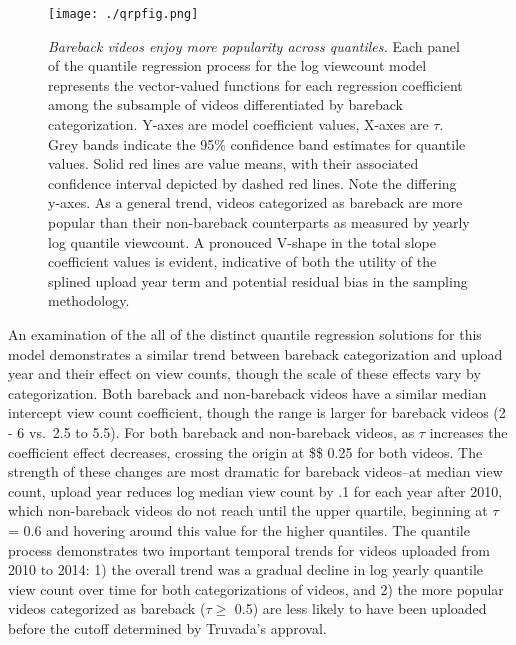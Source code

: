 \documentclass[]{article}
\begin{document}
\begin{figure}
\centering
\texttt{[image: ./qrpfig.png]}
\caption{\emph{Bareback videos enjoy more popularity across quantiles.}
Each panel of the quantile regression process for the log viewcount
model represents the vector-valued functions for each regression
coefficient among the subsample of videos differentiated by bareback
categorization. Y-axes are model coefficient values, X-axes are
\(\tau\). Grey bands indicate the 95\% confidence band estimates for
quantile values. Solid red lines are value means, with their associated
confidence interval depicted by dashed red lines. Note the differing
y-axes. As a general trend, videos categorized as bareback are more
popular than their non-bareback counterparts as measured by yearly log
quantile viewcount. A pronouced V-shape in the total slope coefficient
values is evident, indicative of both the utility of the splined upload
year term and potential residual bias in the sampling methodology.}
\end{figure}

An examination of the all of the distinct quantile regression solutions
for this model demonstrates a similar trend between bareback
categorization and upload year and their effect on view counts, though
the scale of these effects vary by categorization. Both bareback and
non-bareback videos have a similar median intercept view count
coefficient, though the range is larger for bareback videos (2 - 6
vs.~2.5 to 5.5). For both bareback and non-bareback videos, as \(\tau\)
increases the coefficient effect decreases, crossing the origin at
\$\tau \simeq \$ 0.25 for both videos. The strength of these changes are
most dramatic for bareback videos--at median view count, upload year
reduces log median view count by .1 for each year after 2010, which
non-bareback videos do not reach until the upper quartile, beginning at
\(\tau\) = 0.6 and hovering around this value for the higher quantiles.
The quantile process demonstrates two important temporal trends for
videos uploaded from 2010 to 2014: 1) the overall trend was a gradual
decline in log yearly quantile view count over time for both
categorizations of videos, and 2) the more popular videos categorized as
bareback (\(\tau \geq\) 0.5) are less likely to have been uploaded
before the cutoff determined by Truvada's approval.
\end{document}
